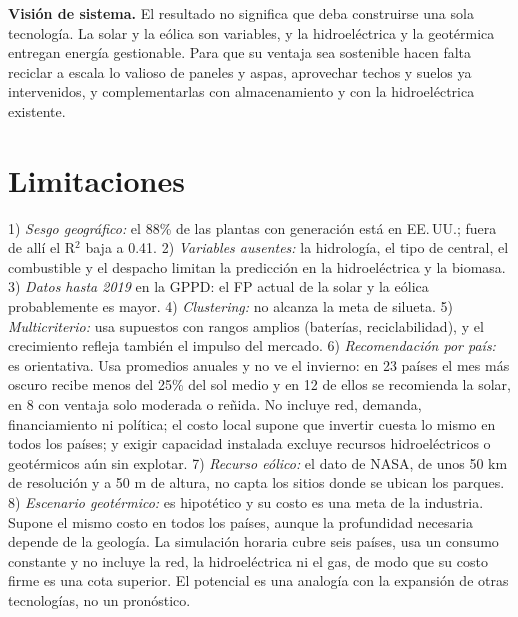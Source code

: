 \documentclass[journal,letterpaper]{IEEEtran}
\begin{document}
\textbf{Visión de sistema.} El resultado no significa que deba construirse una sola tecnología. La solar y la eólica son variables, y la hidroeléctrica y la geotérmica entregan energía gestionable. Para que su ventaja sea sostenible hacen falta reciclar a escala lo valioso de paneles y aspas, aprovechar techos y suelos ya intervenidos, y complementarlas con almacenamiento y con la hidroeléctrica existente.

\section{Limitaciones}
1) \emph{Sesgo geográfico:} el 88\% de las plantas con generación está en EE.\,UU.; fuera de allí el R$^2$ baja a 0.41. 2) \emph{Variables ausentes:} la hidrología, el tipo de central, el combustible y el despacho limitan la predicción en la hidroeléctrica y la biomasa. 3) \emph{Datos hasta 2019} en la GPPD: el FP actual de la solar y la eólica probablemente es mayor. 4) \emph{Clustering:} no alcanza la meta de silueta. 5) \emph{Multicriterio:} usa supuestos con rangos amplios (baterías, reciclabilidad), y el crecimiento refleja también el impulso del mercado. 6) \emph{Recomendación por país:} es orientativa. Usa promedios anuales y no ve el invierno: en 23 países el mes más oscuro recibe menos del 25\% del sol medio y en 12 de ellos se recomienda la solar, en 8 con ventaja solo moderada o reñida. No incluye red, demanda, financiamiento ni política; el costo local supone que invertir cuesta lo mismo en todos los países; y exigir capacidad instalada excluye recursos hidroeléctricos o geotérmicos aún sin explotar. 7) \emph{Recurso eólico:} el dato de NASA, de unos 50 km de resolución y a 50 m de altura, no capta los sitios donde se ubican los parques. 8) \emph{Escenario geotérmico:} es hipotético y su costo es una meta de la industria. Supone el mismo costo en todos los países, aunque la profundidad necesaria depende de la geología. La simulación horaria cubre seis países, usa un consumo constante y no incluye la red, la hidroeléctrica ni el gas, de modo que su costo firme es una cota superior. El potencial es una analogía con la expansión de otras tecnologías, no un pronóstico.
\end{document}

